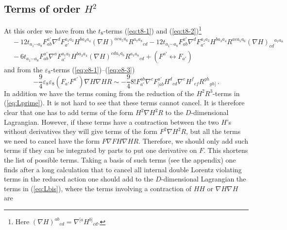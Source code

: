 \documentclass[a4paper,11pt]{article}
\begin{document}
\subsection{Terms of order \texorpdfstring{$H^2$}{H**2}}
At this order we have from the $t_8$-terms (\ref{eq:t8-1}) and (\ref{eq:t8-2})\footnote{Here $(\nabla H)^{ab}{}_{cd}=\nabla^{[a}H^{b]}{}_{cd}$.}
\begin{align}
&{}
-12t_{a_1\cdots a_8}F^{a'}_{ab}\nabla^dF_{a'}^{a_1a_2}H^{ba_3a_4}(\nabla H)^{aca_5a_6}R^{a_7a_8}{}_{cd}
-12t_{a_1\cdots a_8}F^{a'}_{ab}\nabla^dF_{a'}^{a_1a_2}H^{ba_3a_4}R^{aca_5a_6}(\nabla H)_{cd}{}^{a_7a_8}
\nonumber\\
&{}
-6t_{a_1\cdots a_8}F^{a'}_{ab}\nabla^aF_{a'}^{a_1a_2}H^{ba_3a_4}(\nabla H)^{cda_5a_6}R^{a_7a_8}{}_{cd}
+(F^{a'}\leftrightarrow F_{a'})
\end{align}
and from the $\varepsilon_8$-terms (\ref{eq:e8-1})--(\ref{eq:e8-3})
\begin{equation}
-\frac{9}{4}\varepsilon_8\varepsilon_8(F_{a'}F^{a'})\nabla H\nabla HR
\sim
-\frac{9}{4}8!F_{a'}^{ab}\nabla^cF^{a'}_{[ab}H^d{}_{cd}\nabla^eH^f{}_{ef}R^{gh}{}_{gh]}\,.
%
%
\end{equation}
In addition we have the terms coming from the reduction of the $H^2R^3$-terms in (\ref{eq:Lprime}). It is not hard to see that these terms cannot cancel. It is therefore clear that one has to add terms of the form $H^2\nabla H^2R$ to the $D$-dimensional Lagrangian. However, if these terms have a contraction between the two $H$'s without derivatives they will give terms of the form $F^2\nabla H^2R$, but all the terms we need to cancel have the form $F\nabla F H\nabla HR$. Therefore, we should only add such terms if they can be integrated by parts to put one derivative on $F$. This shortens the list of possible terms. Taking a basis of such terms (see the appendix) one finds after a long calculation that to cancel all internal double Lorentz violating terms in the reduced action one should add to the $D$-dimensional Lagrangian the terms in (\ref{eq:Lbis}), where the terms involving a contraction of $HH$ or $\nabla H\nabla H$ are
\end{document}
